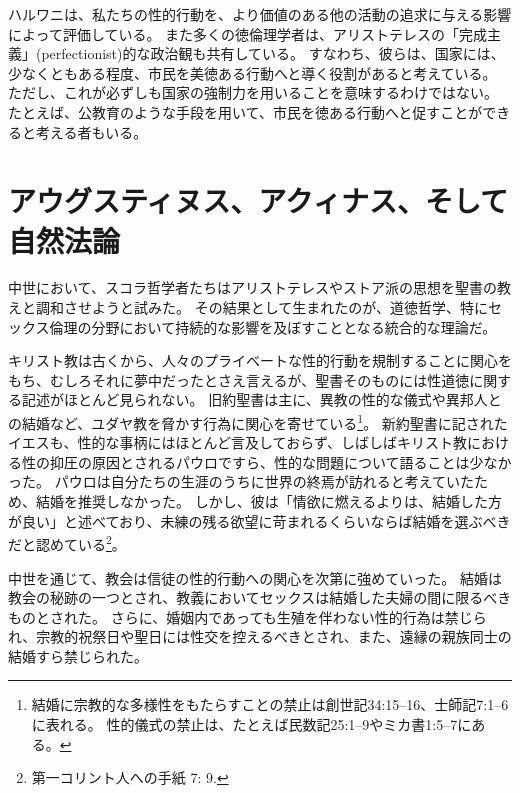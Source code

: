 \documentclass[paper=a4,book,openany]{jlreq}
\newcommand{\ig}[1]{}           %
\begin{document}
 ハルワニは、私たちの性的行動を、より価値のある他の活動の追求に与える影響によって評価している。
また多くの徳倫理学者は、アリストテレスの「完成主義」(perfectionist)的な政治観も共有している。
すなわち、彼らは、国家には、少なくともある程度、市民を美徳ある行動へと導く役割があると考えている。
ただし、これが必ずしも国家の強制力を用いることを意味するわけではない。
たとえば、公教育のような手段を用いて、市民を徳ある行動へと促すことができると考える者もいる。

\section{アウグスティヌス、アクィナス、そして自然法論}

中世において、スコラ哲学者たちはアリストテレスやストア派の思想を聖書の教えと調和させようと試みた。
その結果として生まれたのが、道徳哲学、特にセックス倫理の分野において持続的な影響を及ぼすこととなる統合的な理論だ。

キリスト教は古くから、人々のプライベートな性的行動を規制することに関心をもち、むしろそれに夢中だったとさえ言えるが、聖書そのものには性道徳に関する記述がほとんど見られない。
旧約聖書は主に、異教の性的な儀式や異邦人との結婚など、ユダヤ教を脅かす行為に関心を寄せている\footnote{結婚に宗教的な多様性をもたらすことの禁止は創世記34:15--16、士師記7:1--6に表れる。
性的儀式の禁止は、たとえば民数記25:1--9やミカ書1:5--7にある。
}。
新約聖書に記されたイエス\ig{イエス・キリスト}も、性的な事柄にはほとんど言及しておらず、しばしばキリスト教における性の抑圧の原因とされるパウロ\ig{聖パウロ}ですら、性的な問題について語ることは少なかった。
パウロは自分たちの生涯のうちに世界の終焉が訪れると考えていたため、結婚を推奨しなかった。
しかし、彼は「情欲に燃えるよりは、結婚した方が良い」と述べており、未練の残る欲望に苛まれるくらいならば結婚を選ぶべきだと認めている\footnote{第一コリント人への手紙 7: 9.}。

中世を通じて、教会は信徒の性的行動への関心を次第に強めていった。
結婚は教会の秘跡の一つとされ、教義においてセックスは結婚した夫婦の間に限るべきものとされた。
さらに、婚姻内であっても生殖を伴わない性的行為は禁じられ、宗教的祝祭日や聖日には性交を控えるべきとされ、また、遠縁の親族同士の結婚すら禁じられた。
\end{document}
